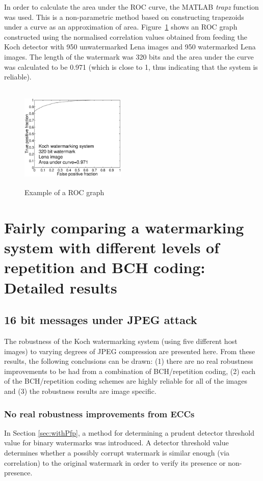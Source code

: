 \documentclass[12pt]{report}
\begin{document}
In order to calculate the area under the ROC curve, the MATLAB \emph{trapz} function was used.
This is a non-parametric
method based on constructing trapezoids under a curve as an approximation of area.
Figure~\ref{fig:rocEx} shows an ROC graph constructed using the normalised correlation 
values obtained from feeding the Koch detector with 950 unwatermarked Lena images and
950 watermarked Lena images. The length of the watermark was 320 bits and the area
under the curve was calculated to be 0.971 (which is close to 1, thus indicating that the system is reliable).
\begin{figure}[htb]
	\begin{center}
		\includegraphics[height=5cm,width=5cm]{BKX_EPS_formattedBetter/ROCgraphs/ROCLenaKoch320ForAppendix.eps}
		\caption{Example of a ROC graph}
		\label{fig:rocEx}
	\end{center}
\end{figure}

\chapter{Fairly comparing a watermarking system with different levels of repetition and BCH coding: Detailed results}
\label{ch:ch10ch11}
\section{16 bit messages under JPEG attack}
\label{sec:jpeg16resultsBK}
The robustness of the Koch watermarking system 
(using five different host images) to varying degrees of JPEG compression are presented
here.
From these results, the following conclusions can be drawn:
(1) there are no real robustness improvements to be had from a combination of BCH/repetition coding,
(2) each of the BCH/repetition coding schemes are highly reliable for all of the images and
(3) the robustness results are image specific.

\subsection{No real robustness improvements from ECCs} 
In Section \ref{sec:withPfp},
a method for determining a prudent detector threshold value for binary watermarks
was introduced. A detector threshold value determines whether a possibly corrupt watermark is similar enough (via correlation) to the original
watermark in order to verify its presence or non-presence.
\end{document}
